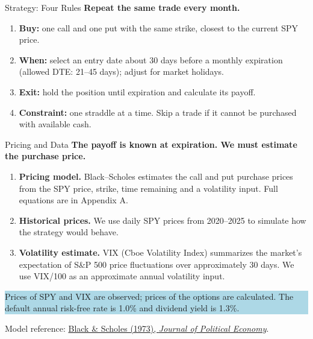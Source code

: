 \documentclass[10pt,aspectratio=169]{beamer}
\newcommand{\softbox}[1]{\colorbox{LightBlue}{\parbox{0.93\linewidth}{\vspace{0.10cm}#1\vspace{0.10cm}}}}
\begin{document}
\begin{frame}{Strategy: Four Rules}
\vspace{0.20cm}
{\large\bfseries Repeat the same trade every month.}\par
\vspace{0.32cm}
\begin{enumerate}\setlength{\itemsep}{0.38cm}
\item \textbf{Buy:} one call and one put with the same strike, closest to the current SPY price.
\item \textbf{When:} select an entry date about 30 days before a monthly expiration (allowed DTE: 21--45 days); adjust for market holidays.
\item \textbf{Exit:} hold the position until expiration and calculate its payoff.
\item \textbf{Constraint:} one straddle at a time. Skip a trade if it cannot be purchased with available cash.
\end{enumerate}
\end{frame}

\begin{frame}{Pricing and Data}
\vspace{0.19cm}
{\large\bfseries The payoff is known at expiration. We must estimate the purchase price.}\par
\vspace{0.34cm}
\begin{enumerate}\setlength{\itemsep}{0.37cm}
\item \textbf{Pricing model.} Black--Scholes estimates the call and put purchase prices from the SPY price, strike, time remaining and a volatility input. Full equations are in Appendix A.
\item \textbf{Historical prices.} We use daily SPY prices from 2020--2025 to simulate how the strategy would behave.
\item \textbf{Volatility estimate.} VIX (Cboe Volatility Index) summarizes the market's expectation of S\&P 500 price fluctuations over approximately 30 days. We use VIX/100 as an approximate annual volatility input.
\end{enumerate}
\vspace{0.16cm}
\softbox{\small Prices of SPY and VIX are observed; prices of the options are calculated. The default annual risk-free rate is 1.0\% and dividend yield is 1.3\%.}
\vspace{0.14cm}
{\small Model reference: \href{https://doi.org/10.1086/260062}{\textcolor{AccentBlue}{Black \& Scholes (1973), \emph{Journal of Political Economy}}}.}
\end{frame}
\end{document}

